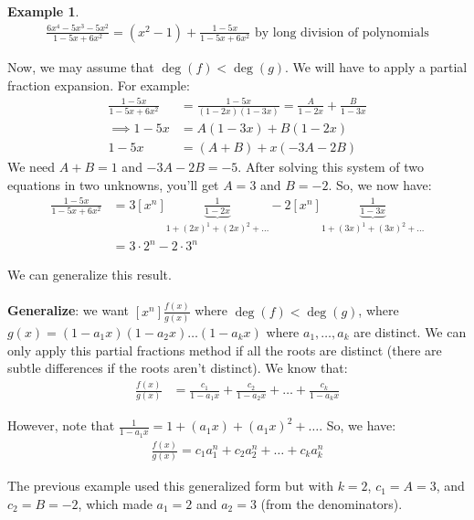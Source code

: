 \documentclass[]{article}
\theoremstyle{definition}
\newtheorem{ex}{Example}[section]
\begin{document}
		\begin{ex}
			\begin{align*}
				\frac{6x^4 - 5x^3 - 5x^2}{1 - 5x + 6x^2} = (x^2 - 1) + \frac{1 - 5x}{1 - 5x + 6x^2} \text{ by long division of polynomials}
			\end{align*}

			Now, we may assume that $\deg(f) < \deg(g)$. We will have to apply a partial fraction expansion. For example:
			\begin{align*}
				\frac{1 - 5x}{1 - 5x + 6x^2} &= \frac{1 - 5x}{(1 - 2x)(1 - 3x)} = \frac{A}{1 - 2x} + \frac{B}{1 - 3x} \\
				\implies 1 - 5x &= A(1 - 3x) + B(1 - 2x) \\
				1 - 5x &= (A + B) + x(-3A - 2B)
			\end{align*}
			We need $A + B = 1$ and $-3A -2B = -5$. After solving this system of two equations in two unknowns, you'll get $A = 3$ and $B = -2$. So, we now have:
			\begin{align*}
				\frac{1 - 5x}{1 - 5x + 6x^2} &= 3[x^n] \underbrace{\frac{1}{1 - 2x}}_{1 + (2x)^1 + (2x)^2 + \ldots} - 2 [x^n] \underbrace{\frac{1}{1 - 3x}}_{1 + (3x)^1 + (3x)^2 + \ldots} \\
				&= 3 \cdot 2^n - 2 \cdot 3^n
			\end{align*}
		\end{ex}

		We can generalize this result.
		\\ \\
		\textbf{Generalize}: we want $[x^n] \frac{f(x)}{g(x)}$ where $\deg(f) < \deg(g)$, where $g(x) = (1 - a_1 x)(1 - a_2 x) \ldots (1 - a_k x)$ where $a_1, \ldots, a_k$ are distinct. We can only apply this partial fractions method if all the roots are distinct (there are subtle differences if the roots aren't distinct). We know that:
		\begin{align*}
			\frac{f(x)}{g(x)} &= \frac{c_1}{1 - a_1 x} + \frac{c_2}{1 - a_2 x} + \ldots + \frac{c_k}{1 - a_k x}
		\end{align*}

		However, note that $\frac{1}{1 - a_1 x} = 1 + (a_1 x) + (a_1 x)^2 + \ldots$. So, we have:
		\begin{align*}
			[x^n] \frac{f(x)}{g(x)} = c_1 a_1^n + c_2 a_2^n + \ldots + c_k a_k^n
		\end{align*}
		
		The previous example used this generalized form but with $k = 2$, $c_1 = A = 3$, and $c_2 = B = -2$, which made $a_1 = 2$ and $a_2 = 3$ (from the denominators).
		
\end{document}
